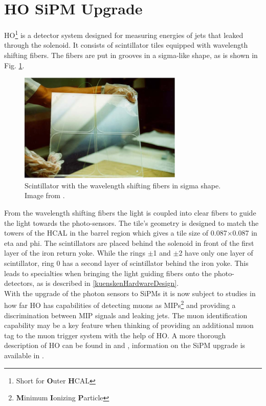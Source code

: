 \section{HO SiPM Upgrade}
HO\footnote{Short for {\bf O}uter {\bf H}CAL} is a detector system designed for measuring energies of jets that leaked through the solenoid. It consists of scintillator tiles equipped with wavelength shifting fibers. The fibers are put in grooves in a sigma-like shape, as is shown in Fig. \ref{kuenskenScintWithFiber}.
\begin{figure}[h]
\centering
\begin{minipage}[t]{0.475\textwidth}
\includegraphics[width=\textwidth]{Figures/kuensken/hoTile.png}
\caption{Scintillator with the wavelength shifting fibers in sigma shape. Image from \cite{hoDesign}.}
\label{kuenskenScintWithFiber}
\end{minipage}
\hspace{1cm}
\begin{minipage}[t]{0.435\textwidth}

\end{minipage}
\end{figure}
From the wavelength shifting fibers the light is coupled into clear fibers to guide the light towards the photo-sensors. The tile's geometry is designed to match the towers of the HCAL in the barrel region which gives a tile size of 0.087$\times$0.087 in eta and phi. The scintillators are placed behind the solenoid in front of the first layer of the iron return yoke. While the rings $\pm$1 and $\pm$2 have only one layer of scintillator, ring 0 has a second layer of scintillator behind the iron yoke. This leads to specialties when bringing the light guiding fibers onto the photo-detectors, as is described in \ref{kuenskenHardwareDesign}.\\
With the upgrade of the photon sensors to SiPMs it is now subject to studies in how far HO has capabilities of detecting muons as MIPs\footnote{{\bf M}inimum {\bf I}onizing {\bf P}article} and providing a discrimination between MIP signals and leaking jets. The muon identification capability may be a key feature when thinking of providing an additional muon tag to the muon trigger system with the help of HO. A more thorough description of HO can be found in \cite{hcalTDR} and \cite{hoDesign}, information on the SiPM upgrade is available in \cite{beniCalor}.
